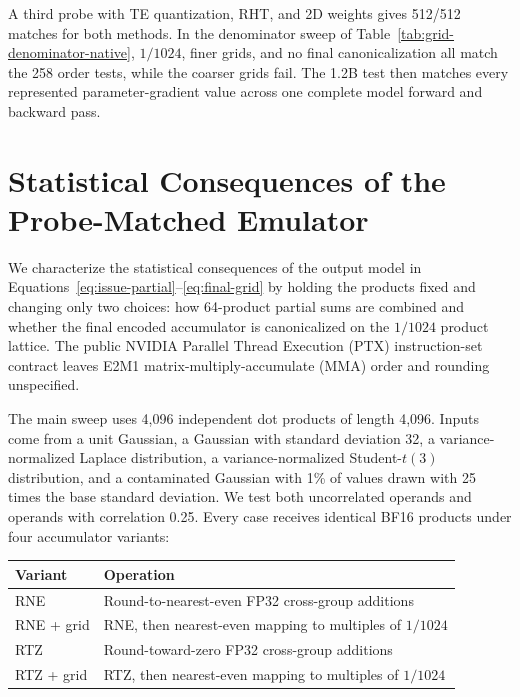 \documentclass[11pt]{article}
\begin{document}
A third probe with TE quantization, RHT, and 2D weights gives 512/512 matches
for both methods.  In the denominator sweep of
Table~\ref{tab:grid-denominator-native}, $1/1024$, finer grids, and no final
canonicalization all match the 258 order tests, while the coarser grids fail.
The 1.2B test then matches every represented parameter-gradient value across
one complete model forward and backward pass.


\section{Statistical Consequences of the Probe-Matched Emulator}
\label{app:gemm-statistics}

We characterize the statistical consequences of the output model in
Equations~\ref{eq:issue-partial}--\ref{eq:final-grid} by holding the products
fixed and changing only two choices: how 64-product partial sums are combined
and whether the final encoded accumulator is canonicalized on the $1/1024$
product lattice.  The public NVIDIA Parallel Thread Execution (PTX)
instruction-set contract leaves E2M1 matrix-multiply-accumulate (MMA) order and
rounding unspecified.

The main sweep uses 4,096 independent dot products of length 4,096.  Inputs
come from a unit Gaussian, a Gaussian with standard deviation 32, a
variance-normalized Laplace distribution, a variance-normalized
Student-$t(3)$ distribution, and a contaminated Gaussian with 1\% of values
drawn with 25 times the base standard deviation.  We test both uncorrelated
operands and operands with correlation 0.25.  Every case receives identical
BF16 products under four accumulator variants:

\begin{center}
\begin{tabular}{@{}ll@{}}
  \toprule
  Variant & Operation \\
  \midrule
  RNE & Round-to-nearest-even FP32 cross-group additions \\
  RNE + grid & RNE, then nearest-even mapping to multiples of $1/1024$ \\
  RTZ & Round-toward-zero FP32 cross-group additions \\
  RTZ + grid & RTZ, then nearest-even mapping to multiples of $1/1024$ \\
  \bottomrule
\end{tabular}
\end{center}
\end{document}

